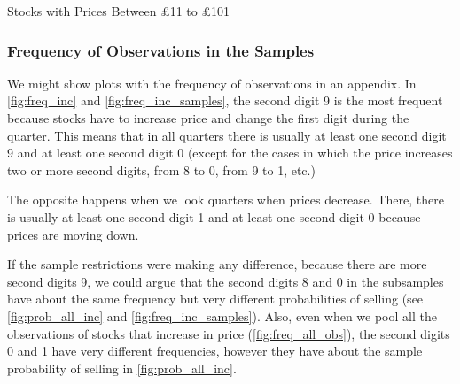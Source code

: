 \begin{econtable}[h]\footnotesize
	\caption{Stocks with Prices Between \pounds 11 to \pounds 101}
	\label{tab:}
\end{econtable}

\clearpage




\subsubsection{Frequency of Observations in the Samples}

We might show plots with the frequency of observations in an appendix. In \ref{fig:freq_inc} and \ref{fig:freq_inc_samples}, the second digit 9 is the most frequent because stocks have to increase price and change the first digit during the quarter. This means that in all quarters there is usually at least one second digit 9 and at least one second digit 0 (except for the cases in which the price increases two or more second digits, from 8 to 0, from 9 to 1, etc.)

The opposite happens when we look quarters when prices decrease. There, there is usually at least one second digit 1 and at least one second digit 0 because prices are moving down.

If the sample restrictions were making any difference, because there are more second digits 9, we could argue that the second digits 8 and 0 in the subsamples have about the same frequency but very different probabilities of selling (see \ref{fig:prob_all_inc}  and \ref{fig:freq_inc_samples}). Also, even when we pool all the observations of stocks that increase in price (\ref{fig:freq_all_obs}), the second digits 0 and 1 have very different frequencies, however they have about the sample probability of selling in \ref{fig:prob_all_inc}.


